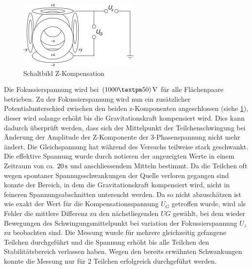 \documentclass[a4paper,12pt]{article}
\begin{document}
\begin{figure}[htb]
		\centering
		\includegraphics{Schaltbild_Z_Kompensation.png}
		\caption{Schaltbild Z-Kompensation}
		\label{schalt-z}
\end{figure}
Die Fokussierspannung wird bei $\unit[(1000±50)]{V}$ für alle Flächenpaare betrieben.
Zu der Fokussierspannung wird nun ein zusätzlicher Potentialunterschied zwischen den beiden z-Komponenten angeschlossen 
(siehe \ref{schalt-z}), dieser wird solange erhöht bis die Gravitationskraft 
kompensiert wird. Dies kann dadurch überprüft werden, dass sich der Mittelpunkt der Teilchenschwingung bei Änderung 
der Amplitude der Z-Komponente der 3-Phasenspannung nicht mehr ändert.
Die Gleichspannung hat während des Versuchs teilweise 
stark geschwankt. Die effektive Spannung wurde durch notieren der angezeigten Werte in einem Zeitraum 
von ca. $\unit[20]{s}$ und anschliessendem Mitteln bestimmt. Da die Teilchen oft wegen spontaner Spannugsschwankungen 
der Quelle verloren gegangen sind konnte der Bereich, in dem die Gravitationskraft kompensiert wird, nicht in feineren Spannungsabschnitten untersucht werden.
Da so nicht abzuschätzen ist wie exakt der Wert für die Kompensationsspannung $U_G$ getroffen wurde, wird als Fehler die mittlere Differenz zu den nächstliegenden 
$UG$ gewählt, bei dem wieder Bewegungen des Schwingungsmittelpunkt bei variation  der Fokussierspannung $U_z$ zu beobachten sind.
Die Messung wurde für mehrere gleichzeitig gefangene Teilchen durchgeführt und die Spannung erhöht bis alle Teilchen den Stabilitätsbereich verlassen haben.
Wegen den bereits erwähnten Schwankungen konnte die Messung nur für 2 Teilchen erfolgreich durchgeführt werden.
	
\end{document}
